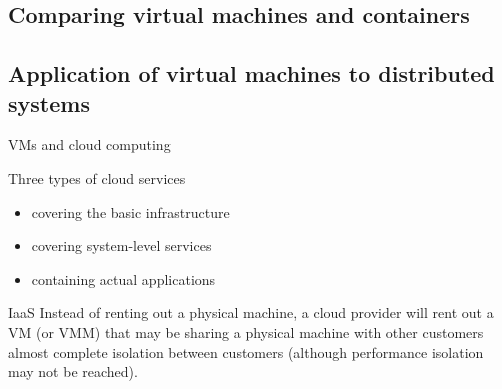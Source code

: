 \subsection{Comparing virtual machines and containers}
\subsection{Application of virtual machines to distributed systems}
\begin{slide}{VMs and cloud computing}
  \begin{block}{Three types of cloud services}
    \begin{itemize}\tightlist
    \item {} covering the basic infrastructure
    \item {} covering system-level services
    \item {} containing actual applications
    \end{itemize}
  \end{block}
  \begin{alertblock}{IaaS}
    Instead of renting out a physical machine, a cloud provider will rent out a VM (or VMM) that may be
    sharing a physical machine with other customers \mathexpr{\Rightarrow} almost complete isolation between
    customers (although performance isolation may not be reached).
  \end{alertblock}
\end{slide}
